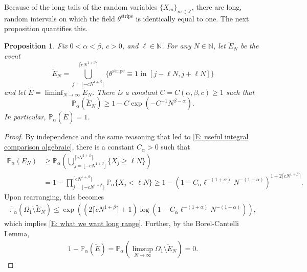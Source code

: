 \documentclass[10pt,a4paper]{amsart}
\newtheorem{prop}{Proposition}
\begin{document}
Because of the long tails of the random variables $\{X_{m}\}_{m \in \mathbb{Z}}$, there are long, random intervals on which the field $\theta^{\text{stripe}}$ is identically equal to one.  The next proposition quantifies this.

	\begin{prop} \label{P: algebraic scale selection} Fix $0 < \alpha < \beta$, $c > 0$, and $\ell \in \mathbb{N}$. For any $N \in \mathbb{N}$, let $\tilde{E}_{N}$ be the event
		\begin{equation*}
			\tilde{E}_{N} = \bigcup_{j = \lfloor -cN^{1 + \beta} \rfloor}^{\lceil cN^{1 + \beta} \rceil} \{\theta^{\text{stripe}} \equiv 1 \, \, \text{in} \, \, [j - \ell N, j + \ell N]\}
		\end{equation*}
	and let $\tilde{E} = \liminf_{N \to \infty} \tilde{E}_{N}$.  There is a constant $C = C(\alpha,\beta,c) \geq 1$ such that
		\begin{equation} \label{E: what we want long range}
			\mathbb{P}_{\alpha}(\tilde{E}_{N}) \geq 1 - C \exp \left( - C^{-1} N^{\beta - \alpha} \right).
		\end{equation}
	In particular, $\mathbb{P}_{\alpha}(\tilde{E}) = 1$. \end{prop}
	
		\begin{proof} By independence and the same reasoning that led to \eqref{E: useful integral comparison algebraic}, there is a constant $C_{\alpha} > 0$ such that 
			\begin{align*}
				\mathbb{P}_{\alpha}(E_{N}) &\geq \mathbb{P}_{\alpha} \left( \bigcup_{ j = \lfloor - c N^{ 1 + \beta } \rfloor }^{ \lceil c N^{ 1 + \beta } \rceil } \{ X_{j} \geq \ell N \} \right) \\
					&= 1 - \prod_{ j = \lfloor - c N^{ 1 + \beta } \rfloor }^{ \lceil c N^{ 1 + \beta } \rceil } \mathbb{P}_{\alpha} \{ X_{j} < \ell N \} \geq 1 - \left( 1 -  C_{\alpha} \ell^{- ( 1 + \alpha ) } N^{- ( 1 + \alpha ) } \right)^{1 + 2 \lceil c N^{ 1 + \beta } \rceil }.
			\end{align*}
		Upon rearranging, this becomes
			\begin{align*}
				\mathbb{P}_{\alpha}( \Omega_{1} \setminus \tilde{E}_{N}) \leq \exp \left( (2 \lceil c N^{1 + \beta} \rceil + 1) \log \left(1 - C_{\alpha} \ell^{- ( 1 + \alpha ) }  N^{- (1 + \alpha) } \right) \right),
			\end{align*}
		which implies \eqref{E: what we want long range}.  Further, by the Borel-Cantelli Lemma, 
			\begin{align*}
		1 - \mathbb{P}_{\alpha} ( \tilde{E} ) = \mathbb{P}_{\alpha} \left(\limsup_{N \to \infty} \Omega_{1} \setminus \tilde{E}_{N} \right) = 0.
			\end{align*}
\end{proof}
	
\end{document}
